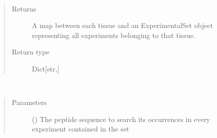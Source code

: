 \documentclass[letterpaper,10pt,english]{sphinxmanual}
\begin{document}
\begin{fulllineitems}
\begin{fulllineitems}
\begin{quote}
\begin{description}
\end{description}\end{quote}

\end{fulllineitems}


\begin{fulllineitems}
\label{\detokenize{IPTK.Classes:IPTK.Classes.ExperimentalSet.ExperimentSet.group_by_tissue}}~\begin{quote}\begin{description}
\item[{Returns}] \leavevmode
A map between each tissue and an ExperimentalSet object representing all experiments belonging to that tissue.

\item[{Return type}] \leavevmode
Dict{[}str,{\hyperref[\detokenize{IPTK.Classes:IPTK.Classes.ExperimentalSet.ExperimentSet}]{}}{]}

\end{description}\end{quote}

\end{fulllineitems}


\begin{fulllineitems}
\label{\detokenize{IPTK.Classes:IPTK.Classes.ExperimentalSet.ExperimentSet.is_peptide_present_in_all}}~\begin{quote}\begin{description}
\item[{Parameters}] \leavevmode
{} () \textendash{} The peptide sequence to search its occurrences in every experiment contained in the set


\end{description}
\end{quote}
\end{fulllineitems}
\end{fulllineitems}
\end{document}
